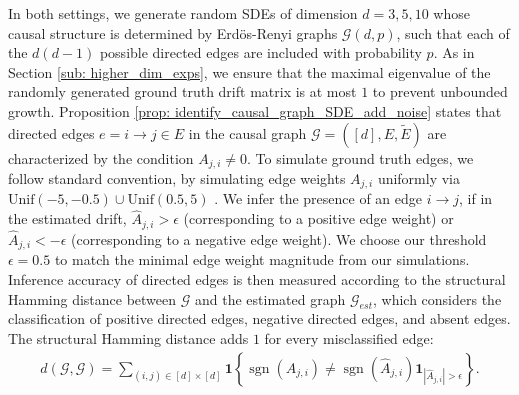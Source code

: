 \documentclass[twoside,11pt]{article}
\begin{document}
In both settings, we generate random SDEs of dimension $d=3,5,10$ whose causal structure is determined by Erdös-Renyi graphs $\mathcal{G}(d,p)$, such that each of the $d(d-1)$ possible directed edges are included with probability $p$. As in Section \ref{sub: higher_dim_exps}, we ensure that the maximal eigenvalue of the randomly generated ground truth drift matrix is at most $1$ to prevent unbounded growth. Proposition \ref{prop: identify_causal_graph_SDE_add_noise} states that directed edges $e=i \to j \in E$  in the causal graph $\mathcal{G} = ([d], E, \tilde{E})$ are characterized by the condition $A_{j,i} \neq 0$. To simulate ground truth edges, we follow standard convention, by simulating edge weights $A_{j,i}$ uniformly via $\text{Unif}(-5, -0.5) \cup \text{Unif}(0.5, 5)$ \citep{runge2021necessary, reisach2021beware}. We infer the presence of an edge $i \to j$, if in the estimated drift, $\hat{A}_{j,i} > \epsilon$ (corresponding to a positive edge weight) or $\hat{A}_{j,i} <- \epsilon$ (corresponding to a negative edge weight). We choose our threshold $\epsilon = 0.5$ to match the minimal edge weight magnitude from our simulations. Inference accuracy of directed edges is then measured according to the structural Hamming distance between $\mathcal{G}$ and the estimated graph $\mathcal{G}_{est}$, which considers the classification of positive directed edges, negative directed edges, and absent edges. The structural Hamming distance adds $1$ for every misclassified edge:
\begin{align}
d(\mathcal{G}, \mathcal{G}) = \sum_{(i, j) \in [d] \times [d]} \mathbf{1}\left\{ \operatorname{sgn}(A_{j,i}) \neq \operatorname{sgn}(\hat{A}_{j,i})\mathbf{1}_{|\hat{A}_{j,i}| > \epsilon}  \right\}.
\label{eq: hamming_A}
\end{align}
\end{document}
